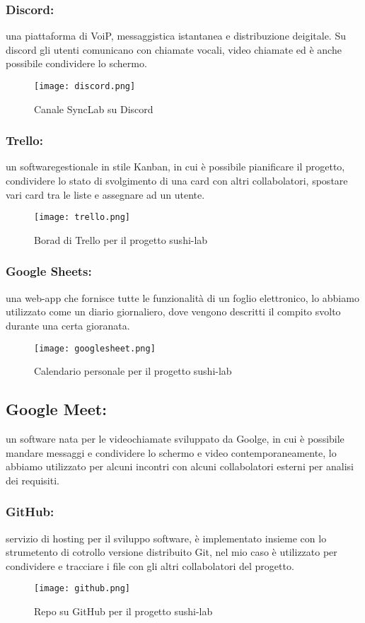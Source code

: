 \subsubsection{Discord:}
una piattaforma di VoiP\gl{}, messaggistica istantanea e distribuzione deigitale. Su discord gli utenti comunicano con chiamate vocali, video chiamate ed è anche possibile condividere lo schermo.
\begin{figure}[H]
    \centering
    \texttt{[image: discord.png]}
    \caption{Canale SyncLab su Discord}
\end{figure}
\subsubsection{Trello:}
un softwaregestionale in stile Kanban\gl{}, in cui è possibile pianificare il progetto, condividere lo stato di svolgimento di una card con altri collabolatori, spostare vari card tra le liste e assegnare ad un utente.
\begin{figure}[H]
    \centering
    \texttt{[image: trello.png]}
    \caption{Borad di Trello per il progetto sushi-lab}
\end{figure}
\subsubsection{Google Sheets:}
una web-app che fornisce tutte le funzionalità di un foglio elettronico, lo abbiamo utilizzato come un diario giornaliero, dove vengono descritti il compito svolto durante una certa gioranata.
\begin{figure}[H]
    \centering
    \texttt{[image: googlesheet.png]}
    \caption{Calendario personale per il progetto sushi-lab}
\end{figure}
\subsection{Google Meet:}
un software nata per le videochiamate sviluppato da Goolge, in cui è possibile mandare messaggi e condividere lo schermo e video contemporaneamente, lo abbiamo utilizzato per alcuni incontri con alcuni collabolatori esterni per analisi dei requisiti.
\subsubsection{GitHub:}
servizio di hosting per il sviluppo software, è implementato insieme con lo strumetento di cotrollo versione distribuito Git\gl{}, nel mio caso è utilizzato per condividere e tracciare i file con gli altri collabolatori del progetto.
\begin{figure}[H]
    \centering
    \texttt{[image: github.png]}
    \caption{Repo su GitHub per il progetto sushi-lab}
\end{figure}

